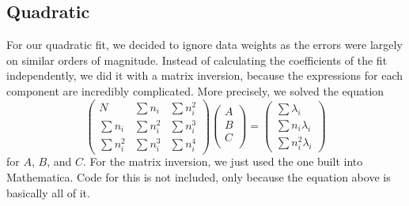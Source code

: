 \documentclass[12pt,twoside]{reedthesis}
\newcommand{\eqn}[1]{\begin{equation}#1\end{equation}}
\begin{document}
\subsection{Quadratic}
For our quadratic fit, we decided to ignore data weights as the errors were largely on similar orders of magnitude.  Instead of calculating the coefficients of the fit independently, we did it with a matrix inversion, because the expressions for each component are incredibly complicated. More precisely, we solved the equation
\eqn{
\left(
\begin{array}{ccc}
N & \sum n_i &  \sum n_i^2 \\
\sum n_i & \sum n_i ^2 & \sum n_i^3 \\
\sum n_i ^2 & \sum n_i^3 & \sum n_i ^4
\end{array}
\right)
\left(
\begin{array}{c}
A \\
B \\
C \\
\end{array}
\right)
=
\left(
\begin{array}{c}
\sum \lambda_i \\
\sum n_i \lambda_i \\
\sum n_i^2 \lambda_i
\end{array}
\right)
}
for $A$, $B$, and $C$. For the matrix inversion, we just used the one built into Mathematica. Code for this is not included, only because the equation above is basically all of it.
\end{document}
